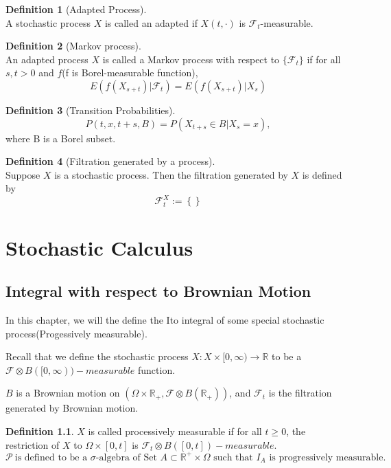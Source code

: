 \documentclass[12pt]{book}
\theoremstyle{definition}
\newtheorem{definition}{Definition}[chapter]
\newcommand{\R}{\mathbb{R}}
\begin{document}
\begin{definition}[Adapted Process] \ \\
A stochastic process $X$ is called an adapted if $X(t,\cdot)$ is $\mathcal{F}_t$-measurable.
\end{definition}

\begin{definition}[Markov process] \ \\
An adapted process $X$ is called a Markov process with respect to $\{\mathcal{F}_t\}$ if for all $s,t>0$ and $f$(f is Borel-measurable function),
$$
E(f(X_{s+t})|\mathcal{F}_t) = E(f(X_{s+t})|X_s) 
$$
\end{definition}

\begin{definition}[Transition Probabilities] \ \\
$$
P(t,x,t+s,B) = P(X_{t+s}\in B|X_s=x),
$$
where B is a Borel subset.
\end{definition}

\begin{definition}[Filtration generated by a process] \ \\
Suppose $X$ is a stochastic process. Then the filtration generated by $X$ is defined by
$$
\mathcal{F}_t^X:=\left\{ \right\}
$$

\end{definition}




\chapter{Stochastic Calculus}
\section{Integral with respect to Brownian Motion}
In this chapter, we will the define the Ito integral of some special stochastic process(Progessively measurable).

Recall that we define the stochastic process $X: X\times [0,\infty) \to \R$ to be a $\mathcal F \otimes B([0,\infty))-measurable$ function. 

$B$ is a Brownian motion on $(\Omega \times \R_+, \mathcal F \otimes B(\R_+))$, and $\mathcal{F}_t$ is the filtration generated by Brownian motion.
\begin{definition}
	$X$ is called processively measurable if for all $t\geq0$, the restriction of $X$ to $\Omega \times [0,t]$ is $\mathcal{F}_t \otimes B([0,t])-measurable$.
$$
\mathcal{P} \ \text{is defined to be a $\sigma$-algebra of Set $A \subset \R^+ \times \Omega$ such that $I_A$ is progressively measurable.}
$$

\end{definition}
\end{document}
